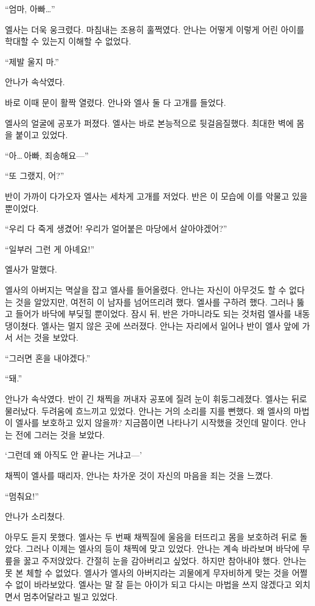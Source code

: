``엄마, 아빠\ldots''

엘사는 더욱 웅크렸다. 마침내는 조용히 훌쩍였다. 안나는 어떻게 이렇게 어린 아이를 학대할 수 있는지 이해할 수 없었다.

``제발 울지 마.''

안나가 속삭였다.

바로 이때 문이 활짝 열렸다. 안나와 엘사 둘 다 고개를 들었다.

엘사의 얼굴에 공포가 퍼졌다. 엘사는 바로 본능적으로 뒷걸음질했다. 최대한 벽에 몸을 붙이고 있었다.

``아\ldots\,아빠, 죄송해요—''

``또 그랬지, 어?''

반이 가까이 다가오자 엘사는 세차게 고개를 저었다. 반은 이 모습에 이를 악물고 있을 뿐이었다.

``우리 다 죽게 생겼어! 우리가 얼어붙은 마당에서 살아야겠어?''

``일부러 그런 게 아녜요!''

엘사가 말했다.

엘사의 아버지는 멱살을 잡고 엘사를 들어올렸다. 안나는 자신이 아무것도 할 수 없다는 것을 알았지만, 여전히 이 남자를 넘어뜨리려 했다. 엘사를 구하려 했다. 그러나 뚫고 들어가 바닥에 부딪힐 뿐이었다. 잠시 뒤, 반은 가마니라도 되는 것처럼 엘사를 내동댕이쳤다. 엘사는 멀지 않은 곳에 쓰러졌다. 안나는 자리에서 일어나 반이 엘사 앞에 가서 서는 것을 보았다.

``그러면 혼을 내야겠다.''

`` 돼.''

안나가 속삭였다. 반이 긴 채찍을 꺼내자 공포에 질려 눈이 휘둥그레졌다. 엘사는 뒤로 물러났다. 두려움에 흐느끼고 있었다. 안나는 거의 소리를 지를 뻔했다. 왜 엘사의 마법이 엘사를 보호하고 있지 않을까? 지금쯤이면 나타나기 시작했을 것인데 말이다. 안나는 전에 그러는 것을 보았다.

`그런데 왜 아직도 안 끝나는 거냐고—'

채찍이 엘사를 때리자, 안나는 차가운 것이 자신의 마음을 죄는 것을 느꼈다.

``멈춰요!''

안나가 소리쳤다.

아무도 듣지 못했다. 엘사는 두 번째 채찍질에 울음을 터뜨리고 몸을 보호하려 뒤로 돌았다. 그러나 이제는 엘사의 등이 채찍에 맞고 있었다. 안나는 계속 바라보며 바닥에 무릎을 꿇고 주저앉았다. 간절히 눈을 감아버리고 싶었다. 하지만 참아내야 했다. 안나는 못 본 체할 수 없었다. 엘사가 엘사의 아버지라는 괴물에게 무자비하게 맞는 것을 어쩔 수 없이 바라보았다. 엘사는 말 잘 듣는 아이가 되고 다시는 마법을 쓰지 않겠다고 외치면서 멈추어달라고 빌고 있었다.

